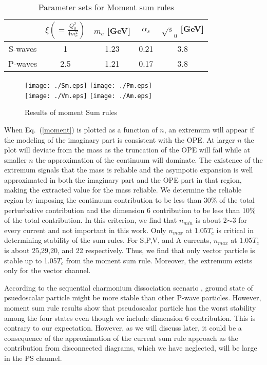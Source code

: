 \documentclass[aps,prc,superscriptaddress,showpacs,floatfix, nofootinbib,preprintnumbers,twocolumn]{revtex4}
\begin{document}
\begin{table}[ht]
\centering
\caption{Parameter sets for Moment sum rules}
\begin{tabular}{ |c|c|c|c|c| }
 \hline
         & $\xi(=\frac{Q_0^2}{4m_c^2})$ & $m_c$ [GeV] & $\alpha_s$ &$\sqrt{s}_0$ [GeV]\\
 \hline
 S-waves & 1 & 1.23&0.21&3.8 \\ 
 \hline
 P-waves & 2.5 & 1.21&0.17&3.8 \\ 
 \hline
\end{tabular}
\end{table}

\begin{figure}[h]
  \centering
  \texttt{[image: ./Sm.eps]}
  \texttt{[image: ./Pm.eps]}\\
  \texttt{[image: ./Vm.eps]}
  \texttt{[image: ./Am.eps]}\\
  \caption{Results of moment Sum rules}
  \label{fig1}
\end{figure}

When Eq.~(\ref{moment}) is plotted as a function of $n$, an extremum will appear if the modeling of the imaginary part is consistent with the OPE.  At larger $n$ the plot will deviate from the mass as the truncation of the OPE will fail while  at smaller $n$ the approximation of the continuum will dominate.  The existence of the extremum signals that the mass is reliable and the asympotic expansion is well approximated in both the imaginary part and the OPE part in that region, making the extracted value for the mass reliable.    We determine the reliable  region by imposing the continuum contribution to be less than 30$\%$ of the total perturbative contribution and the dimension 6 contribution to be less than 10$\%$ of the total contribution. In this criterion, we find that $n_{min}$ is about 2$\sim$3 for every current and not important in this work. Only $n_{max}$ at 1.05$T_c$ is critical in determining stability of the sum rules. For S,P,V, and A currents, $n_{max}$ at 1.05$T_c$ is about 25,29,20, and 22 respectively. Thus, we find that only vector particle is stable up to 1.05$T_c$ from the moment sum rule.  Moreover, the extremum exists only for the vector channel. 

According to the sequential charmonium dissociation scenario \cite{Karsch:2005nk}, ground state of psuedoscalar particle might be more stable than other P-wave particles. However, moment sum rule results show that pseudoscalar particle has the worst stability among the four states even though we include dimension 6 contribution. This is  contrary to our expectation.  However, as we will discuss later, it could be a consequence of the approximation of the current sum rule approach as the contribution from disconnected diagrams, which we have neglected, will be large in the PS channel. \\
\end{document}
